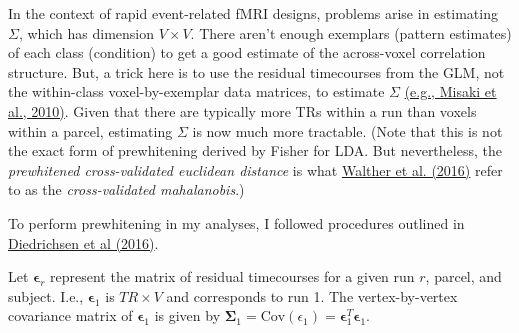 \documentclass{article}\usepackage[]{graphicx}\usepackage[]{color}
\begin{document}
In the context of rapid event-related fMRI designs, problems arise in estimating $\Sigma$, which has dimension $V \times V$.
There aren't enough exemplars (pattern estimates) of each class (condition) to get a good estimate of the across-voxel correlation structure.
But, a trick here is to use the residual timecourses from the GLM, not the within-class voxel-by-exemplar data matrices, to estimate $\Sigma$ \href{https://doi.org/10.1016/j.neuroimage.2010.05.051}{(e.g., Misaki et al., 2010)}.
Given that there are typically more TRs within a run than voxels within a parcel, estimating $\Sigma$ is now much more tractable.
(Note that this is not the exact form of prewhitening derived by Fisher for LDA.
But nevertheless, the \textit{prewhitened cross-validated euclidean distance} is what \href{https://doi.org/10.1016/j.neuroimage.2015.12.012}{Walther et al. (2016)} refer to as the \textit{cross-validated mahalanobis}.)

To perform prewhitening in my analyses, I followed procedures outlined in \href{https://arxiv.org/abs/1607.01371}{Diedrichsen et al (2016)}.

Let $\mathbf{\epsilon}_r$ represent the matrix of residual timecourses for a given run $r$, parcel, and subject.
I.e., $\mathbf{\epsilon}_1$ is $TR \times V$ and corresponds to run 1.
The vertex-by-vertex covariance matrix of $\mathbf{\epsilon}_1$ is given by $\mathbf{\Sigma}_1 = \text{Cov}(\epsilon_1) = \mathbf{\epsilon}_1^T\mathbf{\epsilon}_1$.
\end{document}
